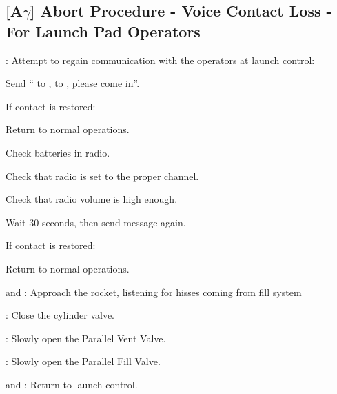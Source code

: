 \newpage

\subsection{[A{\LARGE$\gamma$}] Abort Procedure - Voice Contact Loss - For Launch Pad Operators}
\begin{checklist}
    \item \secondary{}: Attempt to regain communication with the operators at launch control:
    \begin{checklist}
        \item Send ``\secondary{} to \ops{}, \secondary{} to \ops{}, \ops{} please come in''.
        \begin{checklist}[label=$\bullet$]
            \item If contact is restored:
            \begin{checklist}
                \item Return to normal operations.
            \end{checklist}
        \end{checklist}
        \item Check batteries in radio.
        \item Check that radio is set to the proper channel.
        \item Check that radio volume is high enough.
        \item Wait 30 seconds, then send message again.
        \begin{checklist}[label=$\bullet$]
            \item If contact is restored:
            \begin{checklist}
                \item Return to normal operations.
            \end{checklist}
        \end{checklist}
    \end{checklist}
    \item \secondary{} and \primary{}: Approach the rocket, listening for hisses coming from fill system
    \item \primary{}: Close the cylinder valve.
    \item \primary{}: Slowly open the Parallel Vent Valve.
    \item \primary{}: Slowly open the Parallel Fill Valve.
    \item \secondary{} and \primary{}: Return to launch control.
\end{checklist}


